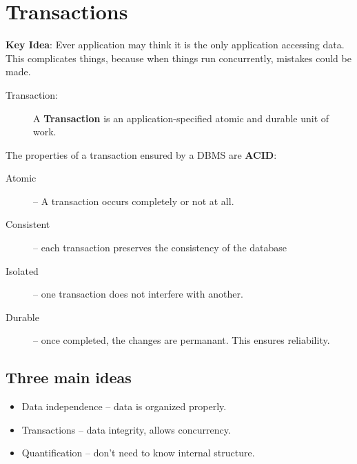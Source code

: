 \documentclass[12pt]{article}
\begin{document}
\section*{Transactions}

\textbf{Key Idea}: Ever application may think it is the only application
accessing data. This complicates things, because when things run concurrently,
mistakes could be made.

\begin{description}
    \item[Transaction:] A \textbf{Transaction} is an application-specified
        atomic and durable unit of work.
\end{description}

The properties of a transaction ensured by a DBMS are \textbf{ACID}:
\begin{description}
    \item[Atomic] -- A transaction occurs completely or not at all.
    \item[Consistent] -- each transaction preserves the consistency of the
        database
    \item[Isolated] -- one transaction does not interfere with another.
    \item[Durable] --  once completed, the changes are permanant. This ensures
        reliability.
\end{description}


\subsection*{Three main ideas}

\begin{itemize}
    \item Data independence -- data is organized properly.
    \item Transactions -- data integrity, allows concurrency.
    \item Quantification -- don't need to know internal structure.
\end{itemize}
\end{document}
